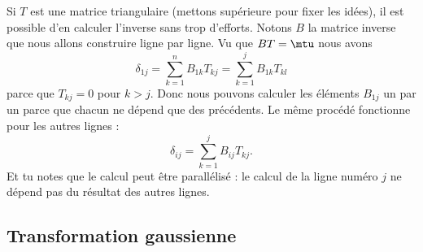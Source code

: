 Si \( T\) est une matrice triangulaire (mettons supérieure pour fixer les idées), il est possible d'en calculer l'inverse sans trop d'efforts. Notons \( B\) la matrice inverse que nous allons construire ligne par ligne. Vu que \( BT=\mtu\) nous avons
\begin{equation}
    \delta_{1j}=\sum_{k=1}^nB_{1k}T_{kj}=\sum_{k=1}^jB_{1k}T_{kl}
\end{equation}
parce que \( T_{kj}=0\) pour \( k>j\). Donc nous pouvons calculer les éléments \( B_{1j} \) un par un parce que chacun ne dépend que des précédents. Le même procédé fonctionne pour les autres lignes :
\begin{equation}
    \delta_{ij}=\sum_{k=1}^jB_{ij}T_{kj}.
\end{equation}
Et tu notes que le calcul peut être parallélisé : le calcul de la ligne numéro \( j\) ne dépend pas du résultat des autres lignes.

\subsection{Transformation gaussienne}

